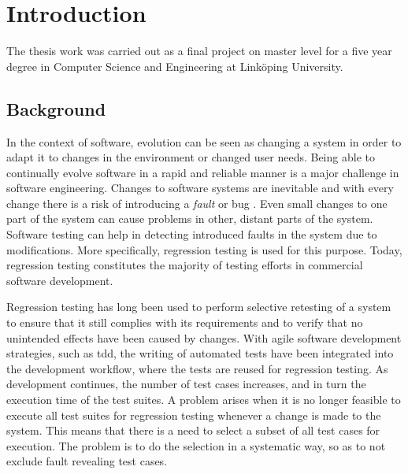 \documentclass[a4paper,english,12pt]{report}
\let\Chapter\chapter
\def\chapter{\addtocontents{lol}{\protect\addvspace{10pt}}\Chapter}
\begin{document}

\printglossary[style=clong]
\thispagestyle{empty}

\tableofcontents
\thispagestyle{empty}
\newpage

\listoffigures	
\thispagestyle{empty}
\newpage

\listoftables
\thispagestyle{empty}
\newpage

\listoflistings
\thispagestyle{empty}
\newpage

\setcounter{page}{1}
\pagestyle{plain}

\chapter{Introduction}
The thesis work was carried out as a final project on master level for a five year degree in Computer Science and Engineering at Linköping University.

\section{Background}
In the context of software, evolution can be seen as changing a system in order to adapt it to changes in the environment or changed user needs. Being able to continually evolve software in a rapid and reliable manner is a major challenge in software engineering. \citep{mens2008software} Changes to software systems are inevitable and with every change there is a risk of introducing a \emph{fault} or bug \citep{asaduzzaman2012bug}. Even small changes to one part of the system can cause problems in other, distant parts of the system. Software testing can help in detecting introduced faults in the system due to modifications. More specifically, regression testing is used for this purpose. Today, regression testing constitutes the majority of testing efforts in commercial software development. \citep{ammann2008introduction}

Regression testing has long been used to perform selective retesting of a system to ensure that it still complies with its requirements and to verify that no unintended effects have been caused by changes. \citep[p. 245]{runeson2012regression} With agile software development strategies, such as \gls{tdd}, the writing of automated tests have been integrated into the development workflow, where the tests are reused for regression testing. \citep[p. 44]{janzen2005test}  As development continues, the number of test cases increases, and in turn the execution time of the test suites. A problem arises when it is no longer feasible to execute all test suites for regression testing whenever a change is made to the system. This means that there is a need to select a subset of all test cases for execution. The problem is to do the selection in a systematic way, so as to not exclude fault revealing test cases. \citep{runeson2012regression}
\end{document}
